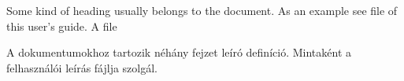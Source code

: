 {
Some kind of heading usually belongs to the document.
As an example see file  of this user's guide.
}
{A  file}
{
A dokumentumokhoz tartozik néhány fejzet leíró definíció.
Mintaként a felhasználói leírás  fájlja szolgál.

}


